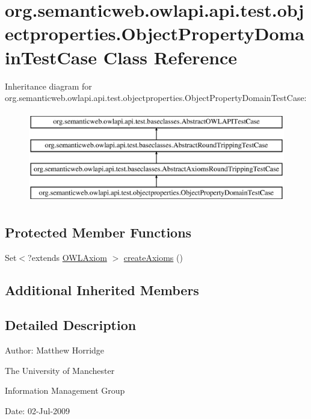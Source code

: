 \hypertarget{classorg_1_1semanticweb_1_1owlapi_1_1api_1_1test_1_1objectproperties_1_1_object_property_domain_test_case}{\section{org.\-semanticweb.\-owlapi.\-api.\-test.\-objectproperties.\-Object\-Property\-Domain\-Test\-Case Class Reference}
\label{classorg_1_1semanticweb_1_1owlapi_1_1api_1_1test_1_1objectproperties_1_1_object_property_domain_test_case}
}
Inheritance diagram for org.\-semanticweb.\-owlapi.\-api.\-test.\-objectproperties.\-Object\-Property\-Domain\-Test\-Case\-:\begin{figure}[H]
\begin{center}
\leavevmode
\includegraphics[height=4.000000cm]{classorg_1_1semanticweb_1_1owlapi_1_1api_1_1test_1_1objectproperties_1_1_object_property_domain_test_case}
\end{center}
\end{figure}
\subsection*{Protected Member Functions}
\begin{DoxyCompactItemize}
\item 
Set$<$?extends \hyperlink{interfaceorg_1_1semanticweb_1_1owlapi_1_1model_1_1_o_w_l_axiom}{O\-W\-L\-Axiom} $>$ \hyperlink{classorg_1_1semanticweb_1_1owlapi_1_1api_1_1test_1_1objectproperties_1_1_object_property_domain_test_case_af09be466c7672cbfb9ea2bc1a9958fc6}{create\-Axioms} ()
\end{DoxyCompactItemize}
\subsection*{Additional Inherited Members}


\subsection{Detailed Description}
Author\-: Matthew Horridge\par
 The University of Manchester\par
 Information Management Group\par
 Date\-: 02-\/\-Jul-\/2009 

